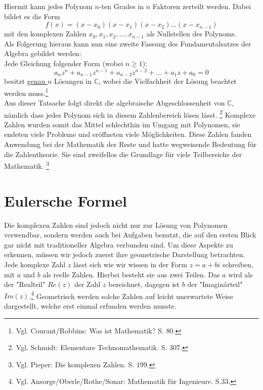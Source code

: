 \documentclass[a4paper,12pt]{article} %
\begin{document}
Hiermit kann jedes Polynom $n$-ten Grades in $n$ Faktoren zerteilt werden.
Dabei bildet es die Form
\begin{equation}\label{eq.faktor}
	\boxed{f(x)=(x-x_0)(x-x_1)(x-x_2)\dots(x-x_{n-1})}
\end{equation}
mit den komplexen Zahlen $x_0, x_1, x_2,\dots,x_{n-1}$ als Nullstellen des Polynoms.\\




Als Folgerung hieraus kann nun eine zweite Fassung des Fundamentalsatzes der Algebra gebildet werden:\\

\noindent Jede Gleichung folgender Form (wobei $n \geq 1$):
\begin{equation}\label{eq:funda2}
		a_nz^n + a_{n-1}z^{n-1} + a_{n-2}z^{n-2} + \dots + a_1z + a_0 = 0	
\end{equation}
besitzt \underline{genau $n$} Lösungen in $\mathbb{C}$, wobei die Vielfachheit der Lösung beachtet werden muss.\footnote{Vgl. Courant/Robbins: Was ist Mathematik? S. $80$.}\\





Aus dieser Tatsache folgt direkt die algebraische Abgeschlossenheit von $\mathbb{C}$, nämlich dass jedes Polynom sich in diesem Zahlenbereich lösen lässt.
\footnote{Vgl. Schmidt: Elementare Technomathematik. S. $307$.} 
Komplexe Zahlen wurden somit das Mittel schlechthin im Umgang mit Polynomen, sie endeten viele Probleme und eröffneten viele Möglichkeiten.
Diese Zahlen fanden Anwendung bei der Mathematik der Reste und hatte wegweisende Bedeutung für die Zahlentheorie.
Sie sind zweifellos die Grundlage für viele Teilbereiche der Mathematik. 
\footnote{Vgl. Pieper: Die komplexen Zahlen. S. $199$.}


\section{Eulersche Formel}

Die komplexen Zahlen sind jedoch nicht nur zur Lösung von Polynomen verwendbar, sondern werden auch bei Aufgaben benutzt, die auf den ersten Blick gar nicht mit traditioneller Algebra verbunden sind.
Um diese Aspekte zu erkennen, müssen wir jedoch zuerst ihre geometrische Darstellung betrachten.\\

Jede komplexe Zahl $z$ lässt sich wie wir wissen in der Form $z=a+bi$ schreiben, mit $a$ und $b$ als reelle Zahlen.
Hierbei besteht sie aus zwei Teilen.
Das $a$ wird als der "Realteil" {} $Re(z)$ der Zahl $z$ bezeichnet, dagegen ist $b$ der "{Imaginärteil}" {} $Im(z)$.\footnote{Vgl. Ansorge/Oberle/Rothe/Sonar: Mathematik für Ingenieure. S.33.}
Geometrisch werden solche Zahlen auf leicht unerwartete Weise dargestellt, welche erst einmal erfunden werden musste.\\
\end{document}
